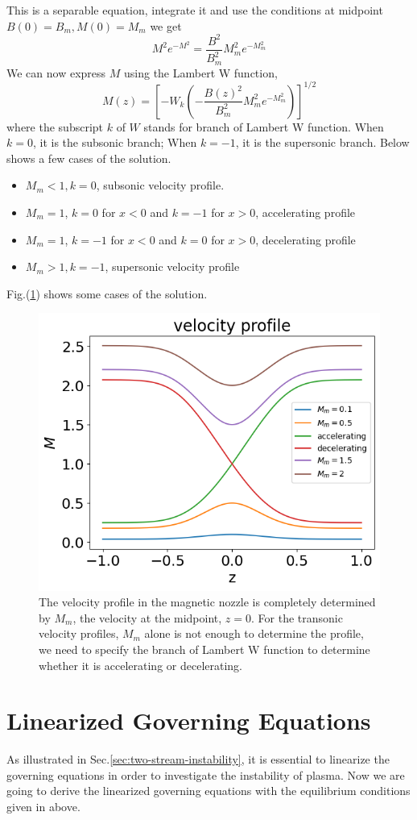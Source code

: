This is a separable equation, integrate it and use the conditions at midpoint $B(0)=B_m, M(0)=M_m$ we get
\[ M^2e^{-M^2} = \frac{B^2}{B_m^2}M_m^2e^{-M_m^2} \]
We can now express $M$ using the Lambert W function,
\[ M(z) = \left[ -W_k\left(-\frac{B(z)^2}{B_m^2}M_m^2e^{-M_m^2}\right) \right]^{1/2} \]
where the subscript $k$ of $W$ stands for branch of Lambert W function. When $k=0$, it is the subsonic branch; When $k=-1$, it is the supersonic branch. Below shows a few cases of the solution.
\begin{itemize}
    \item $M_m < 1, k=0$, subsonic velocity profile.
    \item $M_m = 1$, $k=0$ for $x<0$ and $k=-1$ for $x>0$, accelerating profile
    \item $M_m = 1$, $k=-1$ for $x<0$ and $k=0$ for $x>0$, decelerating profile
    \item $M_m > 1, k=-1$, supersonic velocity profile
\end{itemize}
Fig.(\ref{fig:velocity-profiles}) shows some cases of the solution.
\begin{figure}[H]
    \centering
    \includegraphics[width=0.7\linewidth]{img/velocity-profiles}
    \caption{The velocity profile in the magnetic nozzle is completely determined by $M_m$, the velocity at the midpoint, $z=0$. For the transonic velocity profiles, $M_m$ alone is not enough to determine the profile, we need to specify the branch of Lambert W function to determine whether it is accelerating or decelerating.}
    \label{fig:velocity-profiles}
\end{figure}

\section{Linearized Governing Equations}
As illustrated in Sec.\ref{sec:two-stream-instability}, it is essential to linearize the governing equations in order to investigate the instability of plasma. Now we are going to derive the linearized governing equations with the equilibrium conditions given in above.

